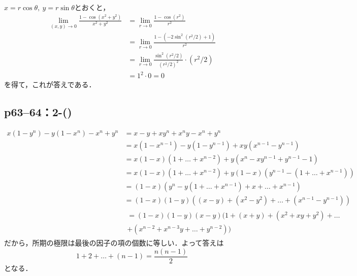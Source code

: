 \begin{tleftbar}
    $x=r \cos \theta,~y=r\sin \theta$とおくと，
    \begin{align*}
        \lim_{(x,y)\to 0} \frac{1-\cos (x^2+y^2)}{x^2+y^2} & = \lim_{r \to 0} \frac{1-\cos (r^2)}{r^2}                       \\
                                                           & =\lim_{r \to 0} \frac{1-(-2\sin ^2 (r^2/2)+1)}{r^2}             \\
                                                           & =\lim_{r \to 0} \frac{\sin ^2 (r^2/2)}{(r^2/2)^2} \cdot (r^2/2) \\
                                                           & = 1^2 \cdot 0 =0
    \end{align*}
    を得て，これが答えである．
\end{tleftbar}

\subsection*{p63--64：2-()}

\begin{leftbar}
    \begin{align*}
        x(1-y^n)-y(1-x^n)-x^n+y^n
         & = x-y+xy^n+x^ny-x^n+y^n                                     \\
         & = x(1-x^{n-1})-y(1-y^{n-1})+xy(x^{n-1}-y^{n-1})             \\
         & = x(1-x)(1+\dots+x^{n-2})+y(x^n-xy^{n-1}+y^{n-1}-1)         \\
         & = x(1-x)(1+\dots+x^{n-2})+y(1-x)(y^{n-1}-(1+\dots+x^{n-1})) \\
         & = (1-x)(y^n-y(1+\dots+x^{n-1})+x+\dots+x^{n-1})             \\
         & = (1-x)(1-y)((x-y)+(x^2-y^2)+\dots+(x^{n-1}-y^{n-1}))       \\
         &
        \begin{multlined}
            = (1-x)(1-y)(x-y)(1+(x+y)+(x^2+xy+y^2)+\dots \\
            +(x^{n-2}+x^{n-3}y+\dots+y^{n-2}))
        \end{multlined}
    \end{align*}
    だから，所期の極限は最後の因子の項の個数に等しい．よって答えは
    \[
        1+2+\ldots+(n-1) = \frac{n(n-1)}{2}
    \]
    となる．
\end{leftbar}


